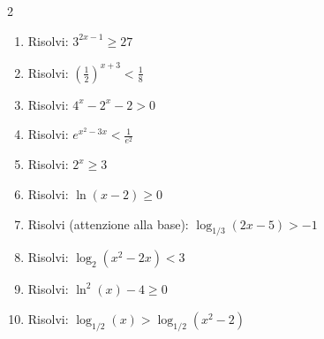 \begin{multicols}{2}
\begin{enumerate}
    \item {} Risolvi: $3^{2x-1} \ge 27$
    \item {} Risolvi: $\left(\frac{1}{2}\right)^{x+3} < \frac{1}{8}$
    \item {} Risolvi: $4^x - 2^x - 2 > 0$
    \item {} Risolvi: $e^{x^2 - 3x} < \frac{1}{e^2}$
    \item {} Risolvi: $2^x \ge 3$
    \item {} Risolvi: $\ln(x - 2) \ge 0$
    \item {} Risolvi (attenzione alla base): $\log_{1/3}(2x-5) > -1$
    \item {} Risolvi: $\log_2(x^2 - 2x) < 3$
    \item {} Risolvi: $\ln^2(x) - 4 \ge 0$
    \item {} Risolvi: $\log_{1/2}(x) > \log_{1/2}(x^2 - 2)$
\end{enumerate}
\end{multicols}

